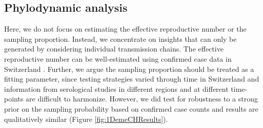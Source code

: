 \documentclass[9pt,twoside,lineno]{pnas-new} %
\begin{document}
{%


\subsection*{Phylodynamic analysis}

Here, we do not focus on estimating the effective reproductive number or the sampling proportion. Instead, we concentrate on insights that can only be generated by considering individual transmission chains. The effective reproductive number can be well-estimated using confirmed case data in Switzerland \cite{shinyRe}. Further, we argue the sampling proportion should be treated as a fitting parameter, since testing strategies varied through time in Switzerland and information from serological studies in different regions and at different time-points are difficult to harmonize. However, we did test for robustness to a strong prior on the sampling probability based on confirmed case counts and results are qualitatively similar (Figure \ref{fig:1DemeCHResults}).

}
\end{document}

